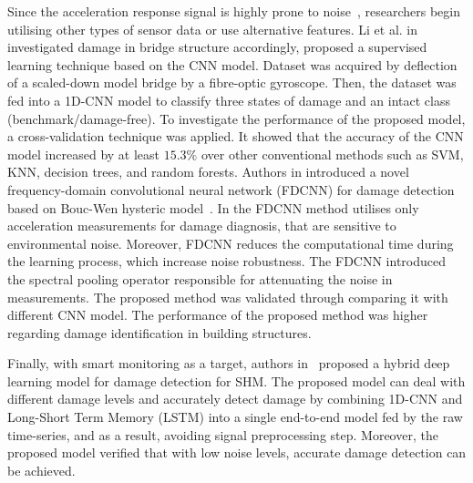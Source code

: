 Since the acceleration response signal is highly prone to noise~\cite{Azimi2020}, researchers begin utilising other types of sensor data or use alternative features.  
Li et al. in ~\cite{Li2020a} investigated damage in bridge structure accordingly, proposed a supervised learning technique based on the CNN model.
Dataset was acquired by deflection of a scaled-down model bridge by a fibre-optic gyroscope.
Then, the dataset was fed into a 1D-CNN model to classify three states of damage and an intact class (benchmark/damage-free).
To investigate the performance of the proposed model, a cross-validation technique was applied. 
It showed that the accuracy of the CNN model increased by at least \(15.3\%\) over other conventional methods such as SVM, KNN, decision trees, and random forests.
Authors in \cite{Lopez-Pacheco2020} introduced a novel frequency-domain convolutional neural network (FDCNN) for damage detection based on Bouc-Wen hysteric model~\cite{Ismail2009}.  
In the FDCNN method utilises only acceleration measurements for damage diagnosis, that are sensitive to environmental noise.
Moreover, FDCNN reduces the computational time during the learning process, which increase noise robustness.
The FDCNN introduced the spectral pooling operator responsible for attenuating the noise in measurements.
The proposed method was validated through comparing it with different CNN model. 
The performance of the proposed method was higher regarding damage identification in building structures.

Finally, with smart monitoring as a target, authors in~\cite{Hung2020}  proposed a hybrid deep learning model for damage detection for SHM.
The proposed model can deal with different damage levels and accurately detect damage by combining 1D-CNN and Long-Short Term Memory (LSTM) into a single end-to-end model fed by the raw time-series, and as a result, avoiding signal preprocessing step.
Moreover, the proposed model verified that with low noise levels,  accurate damage detection can be achieved.


